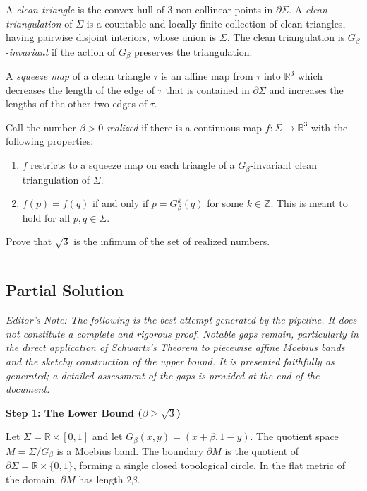 \documentclass[12pt]{article}
\begin{document}
A \textit{clean triangle} is the convex hull of $3$ non-collinear points in $\partial \Sigma$. 
A \textit{clean triangulation} of $\Sigma$ is a countable and locally finite collection of clean triangles, having pairwise disjoint interiors, whose union is $\Sigma$. The clean triangulation is $G_{\beta}$-\textit{invariant} if the action of $G_{\beta}$ preserves the triangulation.

A \textit{squeeze map} of a clean triangle $\tau$ is an affine map from $\tau$ into $\mathbb{R}^3$ which decreases the length of the edge of $\tau$ that is contained in $\partial \Sigma$ and increases the lengths of the other two edges of $\tau$.

Call the number $\beta>0$ \textit{realized} if there is a continuous map $f: \Sigma \to \mathbb{R}^3$ with the following properties:
\begin{enumerate}
\item $f$ restricts to a squeeze map on each triangle of a $G_{\beta}$-invariant clean triangulation of $\Sigma$.
\item $f(p)=f(q)$ if and only if $p=G_{\beta}^k(q)$ for some $k \in \mathbb{Z}$. This is meant to hold for all $p,q \in \Sigma$.
\end{enumerate}
Prove that $\sqrt 3$ is the infimum of the set of realized numbers.

\vspace{1em}
\hrule
\vspace{1em}

\subsection*{Partial Solution}

\textit{Editor's Note: The following is the best attempt generated by the pipeline. It does not constitute a complete and rigorous proof. Notable gaps remain, particularly in the direct application of Schwartz's Theorem to piecewise affine Moebius bands and the sketchy construction of the upper bound. It is presented faithfully as generated; a detailed assessment of the gaps is provided at the end of the document.}

\vspace{1em}

\noindent\textbf{Step 1: The Lower Bound ($\beta \ge \sqrt{3}$)}

\vspace{0.5em}

Let $\Sigma = \mathbb{R} \times [0,1]$ and let $G_{\beta}(x,y) = (x+\beta, 1-y)$. The quotient space $M = \Sigma / G_{\beta}$ is a Moebius band. The boundary $\partial M$ is the quotient of $\partial \Sigma = \mathbb{R} \times \{0,1\}$, forming a single closed topological circle. In the flat metric of the domain, $\partial M$ has length $2\beta$.
\end{document}

